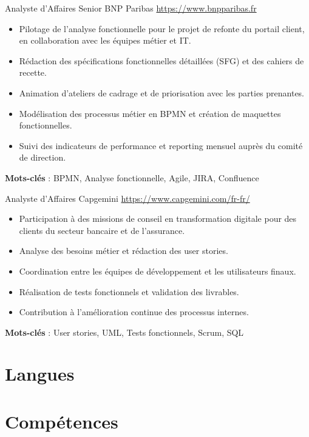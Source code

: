 \documentclass[a4paper, serif, 10pt]{moderncv}
\begin{document}
        {Analyste d'Affaires Senior}
        {BNP Paribas}
        {\url{https://www.bnpparibas.fr}}
        {}
        {\begin{itemize}
\item Pilotage de l'analyse fonctionnelle pour le projet de refonte du portail client, en collaboration avec les équipes métier et IT.
\item Rédaction des spécifications fonctionnelles détaillées (SFG) et des cahiers de recette.
\item Animation d'ateliers de cadrage et de priorisation avec les parties prenantes.
\item Modélisation des processus métier en BPMN et création de maquettes fonctionnelles.
\item Suivi des indicateurs de performance et reporting mensuel auprès du comité de direction.
\end{itemize}
\textbf{Mots-clés} : BPMN, Analyse fonctionnelle, Agile, JIRA, Confluence}

        {Analyste d'Affaires}
        {Capgemini}
        {\url{https://www.capgemini.com/fr-fr/}}
        {}
        {\begin{itemize}
\item Participation à des missions de conseil en transformation digitale pour des clients du secteur bancaire et de l'assurance.
\item Analyse des besoins métier et rédaction des user stories.
\item Coordination entre les équipes de développement et les utilisateurs finaux.
\item Réalisation de tests fonctionnels et validation des livrables.
\item Contribution à l'amélioration continue des processus internes.
\end{itemize}
\textbf{Mots-clés} : User stories, UML, Tests fonctionnels, Scrum, SQL}
\section{Langues}

\section{Compétences}
\end{document}
